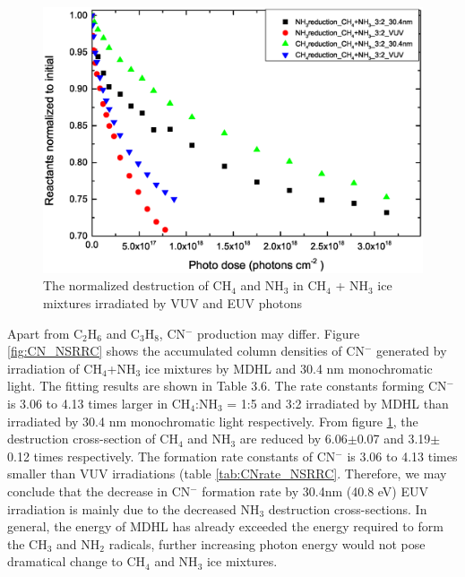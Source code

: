 \begin{figure}
\centering
\includegraphics[width=\textwidth]{figures/chapter3/Reactants_normalized_to_initial.eps}
\caption{The normalized destruction of CH$_4$ and NH$_3$ in CH$_4$ + NH$_3$ ice mixtures irradiated by VUV and EUV photons}
\label{fig:normalized_reactants}
\end{figure}

Apart from C$_2$H$_6$ and C$_3$H$_8$, CN$^-$ production may differ. Figure \ref{fig:CN_NSRRC} shows the accumulated column densities of CN$^-$ generated by irradiation of CH$_4$+NH$_3$ ice mixtures by MDHL and 30.4 nm monochromatic light. The fitting results are shown in Table 3.6. The rate constants forming CN$^-$ is 3.06 to 4.13 times larger in CH$_4$:NH$_3$ = 1:5 and 3:2 irradiated by MDHL than irradiated by 30.4 nm monochromatic light respectively. From figure \ref{fig:normalized_reactants}, the destruction cross-section of CH$_4$ and NH$_3$ are reduced by 6.06$\pm$0.07 and 3.19$\pm$0.12 times respectively. The formation rate constants of CN$^-$ is 3.06 to 4.13 times smaller than VUV irradiations (table \ref{tab:CNrate_NSRRC}. Therefore, we may conclude that the decrease in CN$^-$ formation rate by 30.4nm (40.8 eV) EUV irradiation is mainly due to the decreased NH$_3$ destruction cross-sections. In general, the energy of MDHL has already exceeded the energy required to form the CH$_3$ and NH$_2$ radicals, further increasing photon energy would not pose dramatical change to CH$_4$ and NH$_3$ ice mixtures.\\

